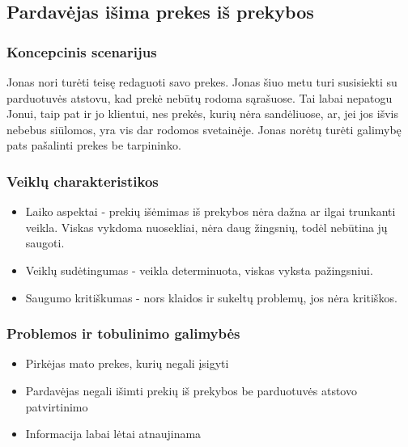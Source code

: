 \documentclass[oneside]{VUMIFPSkursinis}
\begin{document}
	\subsection{Pardavėjas išima prekes iš prekybos}
		\subsubsection{Koncepcinis scenarijus}
			Jonas nori turėti teisę redaguoti savo prekes. Jonas šiuo metu turi susisiekti su parduotuvės atstovu, kad prekė nebūtų rodoma sąrašuose. Tai labai nepatogu Jonui, taip pat ir jo klientui, nes prekės, kurių nėra sandėliuose, ar, jei jos išvis nebebus siūlomos, yra vis dar rodomos svetainėje. Jonas norėtų turėti galimybę pats pašalinti prekes be tarpininko.
		\subsubsection{Veiklų charakteristikos}
		\begin{itemize}
		\item{Laiko aspektai - prekių išėmimas iš prekybos nėra dažna ar ilgai trunkanti veikla. 
		Viskas vykdoma nuosekliai, nėra daug žingsnių, todėl nebūtina jų saugoti. }
		\item{Veiklų sudėtingumas - veikla determinuota, viskas vyksta pažingsniui.}
		\item{Saugumo kritiškumas - nors klaidos ir sukeltų problemų, jos nėra kritiškos.}
		\end{itemize}
		\subsubsection{Problemos ir tobulinimo galimybės}
			\begin{itemize}
				\item{Pirkėjas mato prekes, kurių negali įsigyti}
				\item{Pardavėjas negali išimti prekių iš prekybos be parduotuvės atstovo patvirtinimo}
				\item{Informacija labai lėtai atnaujinama}
			\end{itemize}
\end{document}

